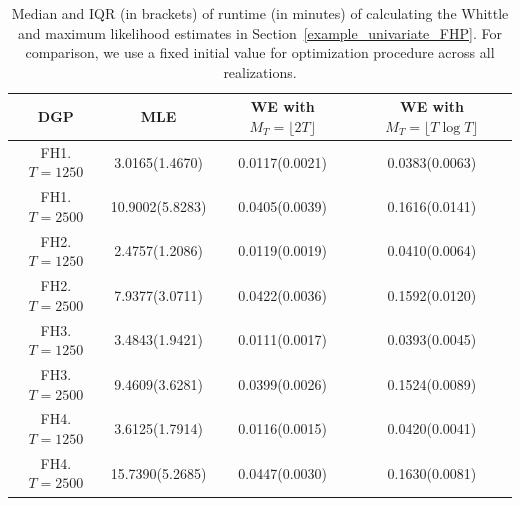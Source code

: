 \documentclass[11pt]{article}
\numberwithin{equation}{section}
\theoremstyle{plain}
\theoremstyle{definition}
\theoremstyle{definition}
\theoremstyle{assumption}
\theoremstyle{proposition}
\theoremstyle{proposition}
\theoremstyle{example}
\theoremstyle{lemma}
\theoremstyle{theorem}
\theoremstyle{remark}
\begin{document}
\begin{table}[!h]
\caption{Median and IQR (in brackets) of runtime (in minutes) of calculating the Whittle and maximum likelihood estimates in Section~\ref{example_univariate_FHP}. For comparison, we use a fixed initial value for optimization procedure across all realizations.}
\label{table_runtime_uniFH}
\begin{center}
\begin{tabular}{|c c c c|} 
 \hline
 DGP & MLE & WE with $M_T = \lfloor 2T\rfloor$ & WE with $M_T = \lfloor T\log T\rfloor$  \\ [0.5ex] 
 \hline\hline
 FH1. $T=1250$ & 3.0165(1.4670) & 0.0117(0.0021) & 0.0383(0.0063) \\ 
 \hline
 FH1. $T=2500$ & 10.9002(5.8283) & 0.0405(0.0039) & 0.1616(0.0141)\\
 \hline
 \hline
 FH2. $T=1250$ & 2.4757(1.2086) & 0.0119(0.0019) & 0.0410(0.0064)\\
 \hline
 FH2. $T=2500$ & 7.9377(3.0711) & 0.0422(0.0036) & 0.1592(0.0120)\\ 
 \hline
 \hline
 FH3. $T=1250$ & 3.4843(1.9421) & 0.0111(0.0017) & 0.0393(0.0045)\\
 \hline
 FH3. $T=2500$ & 9.4609(3.6281) & 0.0399(0.0026) & 0.1524(0.0089)\\
 \hline
 \hline
 FH4. $T=1250$ & 3.6125(1.7914) & 0.0116(0.0015) & 0.0420(0.0041) \\ 
 \hline
 FH4. $T=2500$ & 15.7390(5.2685) & 0.0447(0.0030) & 0.1630(0.0081)\\
 \hline
\end{tabular}
\end{center}
\end{table}
\end{document}

